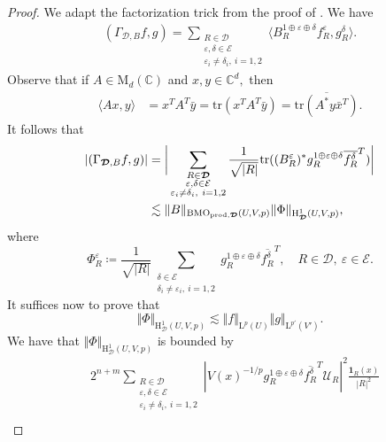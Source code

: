 \documentclass{article}
\theoremstyle{definition}
\theoremstyle{remark}
\numberwithin{equation}{section}
\newcommand{\cE}{\mathcal{E}}
\newcommand{\cU}{\mathcal{U}}
\newcommand{\bfD}{\bm{\mathcal{D}}}
\newcommand{\e}{\varepsilon}
\newcommand{\complex}{\mathbb{C}}
\newcommand{\Lp}[1]{\mathrm{L}^{#1}}
\newcommand{\1}{\mathbf{1}}
\newcommand{\tr}{\mathrm{tr}}
\newcommand{\BMOprodD}{\ensuremath\text{BMO}_{\text{prod},\bfD}}
\begin{document}
\begin{proof}
        \item[(b)] We adapt the factorization trick from the proof of \cite[Proposition 6.1]{Holmes_Petermichl_Wick_2018}. We have
        \begin{align*}
            (\Gamma_{\bfD,B}f,g)=\sum_{\substack{R\in\bfD\\\e,\delta\in\cE\\\e_i\neq\delta_i,~i=1,2}}\langle B_{R}^{1\oplus\e\oplus\delta}f_{R}^{\e},g_{R}^{\delta}\rangle.
        \end{align*}
        Observe that if $A\in \mathrm{M}_{d}(\complex)$ and $x,y\in\complex^d,$ then
        \begin{align*}
            \langle Ax,y\rangle&=x^{T}A^{T}\bar{y}=\tr(x^{T}A^{T}\bar{y})=\overline{\tr(A^{\ast}y\bar{x}^{T})}.
        \end{align*}
        It follows that
        \begin{align*}
            |(\Gamma_{\bfD,B}f,g)|&
            =\bigg|\sum_{\substack{R\in\bfD\\\e,\delta\in\cE\\\e_i\neq\delta_i,~i=1,2}}\frac{1}{\sqrt{|R|}}\text{tr}((B_{R}^{\e})^{\ast}g_{R}^{1\oplus\e\oplus\delta}\overline{f_{R}^{\delta}}^{T})\bigg|\\
            &\lesssim\Vert B\Vert_{\BMOprodD(U,V,p)}\Vert\Phi\Vert_{\mathrm{H}^1_{\bfD}(U,V,p)},
        \end{align*}
        where
        \begin{equation*}
            \Phi_{R}^{\e}\coloneq \frac{1}{\sqrt{|R|}}\sum_{\substack{\delta\in\cE\\\delta_i\neq\e_i,~i=1,2}}
            g_{R}^{1\oplus\e\oplus\delta}\overline{f_{R}^{\delta}}^{T},\quad R\in\bfD,~\e\in\cE.
        \end{equation*}
        It suffices now to prove that
        \begin{equation*}
            \Vert\Phi\Vert_{\mathrm{H}^1_{\bfD}(U,V,p)}\lesssim\Vert f\Vert_{\Lp{p}(U)}\Vert g\Vert_{\Lp{p'}(V')}.
        \end{equation*}
        We have that $\Vert\Phi\Vert_{\mathrm{H}^1_{\bfD}(U,V,p)}$ is bounded by
        \begin{align*}
            & 2^{n+m}\sum_{\substack{R\in\bfD\\\e,\delta\in\cE\\\e_i\neq\delta_i,~i=1,2}}|V(x)^{-1/p} g_{R}^{1\oplus\e\oplus\delta}\overline{f_{R}^{\delta}}^{T}\cU_{R}|^2\frac{\1_{R}(x)}{|R|^2}\\

\end{align*}
\end{proof}
\end{document}
